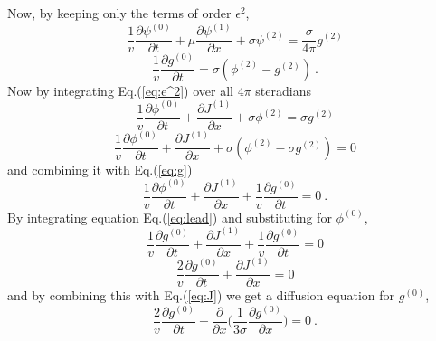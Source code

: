 \documentclass{article}
\begin{document}
Now, by keeping only the terms of order $\epsilon^2$,
\begin{equation}
\label{eq:e^2}
\frac{1}{v} \frac{\partial \psi^{(0)}}{\partial t} + \mu \frac{\partial \psi^{(1)} }{\partial x} + \sigma \psi^{(2)}  =  \frac{\sigma}{4\pi} g^{(2)} 
\end{equation}
\begin{equation}
\label{eq:g}
\frac{1}{v} \frac{\partial  g^{(0)}}{\partial t}  = \sigma ( \phi^{(2)} - g^{(2)} )  \: .
\end{equation}
Now by integrating Eq.(\ref{eq:e^2}) over all $4\pi$ steradians
\begin{equation*}
\frac{1}{v} \frac{\partial \phi^{(0)}}{\partial t} + \frac{\partial J^{(1)} }{\partial x} + \sigma \phi^{(2)} =  \sigma g^{(2)} 
\end{equation*}
\begin{equation*}
\frac{1}{v} \frac{\partial \phi^{(0)}}{\partial t} + \frac{\partial J^{(1)} }{\partial x} + \sigma (\phi^{(2)} - \sigma g^{(2)}) = 0
\end{equation*}
and combining it with Eq.(\ref{eq:g})
\begin{equation*}
\frac{1}{v} \frac{\partial \phi^{(0)}}{\partial t} + \frac{\partial J^{(1)} }{\partial x} + \frac{1}{v} \frac{\partial  g^{(0)}}{\partial t} = 0 \: .
\end{equation*}
By integrating equation Eq.(\ref{eq:lead}) and substituting for $\phi^{(0)}$,
\begin{equation*}
\frac{1}{v} \frac{\partial g^{(0)}}{\partial t} + \frac{\partial J^{(1)} }{\partial x} + \frac{1}{v} \frac{\partial  g^{(0)}}{\partial t} = 0 
\end{equation*}
\begin{equation*}
\frac{2}{v} \frac{\partial g^{(0)}}{\partial t} + \frac{\partial J^{(1)} }{\partial x} = 0 
\end{equation*}
and by combining this with Eq.(\ref{eq:J}) we get a diffusion equation for $g^{(0)}$,
\begin{equation*}
\boxed{ \frac{2}{v} \frac{\partial g^{(0)}}{\partial t} - \frac{\partial}{\partial x} \Big(\frac{1 }{3\sigma} \frac{\partial g^{(0)} }{\partial x} \Big) = 0 } \: .
\end{equation*}
\end{document}
